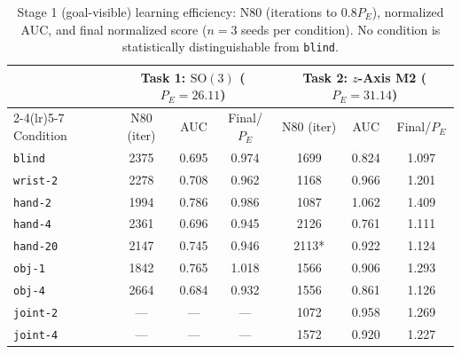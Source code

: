 \begin{table}[h]
  \centering
  \caption{Stage 1 (goal-visible) learning efficiency: N80 (iterations to $0.8 P_E$), normalized AUC, and final normalized score ($n=3$ seeds per condition). No condition is statistically distinguishable from \texttt{blind}.}
  \label{tab:app_stage1}
  \small
  \begin{tabular}{lcccccc}
    \toprule
    & \multicolumn{3}{c}{Task 1: $\mathrm{SO}(3)$ ($P_E=26.11$)} & \multicolumn{3}{c}{Task 2: $z$-Axis M2 ($P_E=31.14$)} \\
    \cmidrule(lr){2-4}\cmidrule(lr){5-7}
    Condition & N80 (iter) & AUC & Final/$P_E$ & N80 (iter) & AUC & Final/$P_E$ \\
    \midrule
    \texttt{blind} & 2375 & 0.695 & 0.974 & 1699 & 0.824 & 1.097 \\
    \texttt{wrist-2} & 2278 & 0.708 & 0.962 & 1168 & 0.966 & 1.201 \\
    \texttt{hand-2} & 1994 & 0.786 & 0.986 & 1087 & 1.062 & 1.409 \\
    \texttt{hand-4} & 2361 & 0.696 & 0.945 & 2126 & 0.761 & 1.111 \\
    \texttt{hand-20} & 2147 & 0.745 & 0.946 & 2113* & 0.922 & 1.124 \\
    \texttt{obj-1} & 1842 & 0.765 & 1.018 & 1566 & 0.906 & 1.293 \\
    \texttt{obj-4} & 2664 & 0.684 & 0.932 & 1556 & 0.861 & 1.126 \\
    \texttt{joint-2} & --- & --- & --- & 1072 & 0.958 & 1.269 \\
    \texttt{joint-4} & --- & --- & --- & 1572 & 0.920 & 1.227 \\
    \bottomrule
  \end{tabular}
\end{table}

